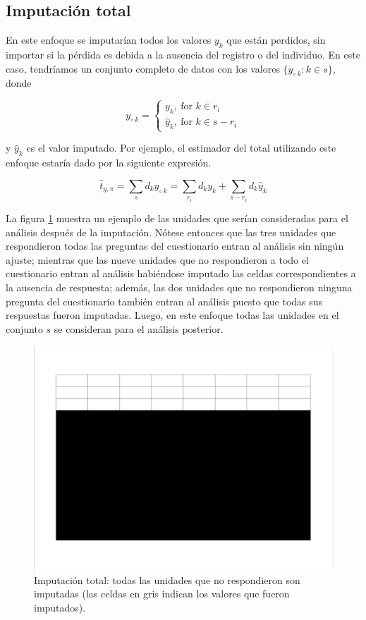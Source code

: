\documentclass[
  12pt,
  spanish,
]{book}
\begin{document}
\hypertarget{imputaciuxf3n-total}{%
\subsection{Imputación total}\label{imputaciuxf3n-total}}

En este enfoque se imputarían todos los valores \(y_k\) que están perdidos, sin importar si la pérdida es debida a la ausencia del registro o del individuo. En este caso, tendríamos un conjunto completo de datos con los valores \(\{y_{\circ \  k}: k\in s\}\), donde

\[
y_{\circ \  k} = 
\begin{cases}
y_k, \ \text{for $k \in r_i$} \\
\hat{y}_k, \ \text{for $k \in s - r_i$}
\end{cases}
\]

y \(\hat{y}_k\) es el valor imputado. Por ejemplo, el estimador del total utilizando este enfoque estaría dado por la siguiente expresión.

\[
\hat{t}_{y,\pi} = \sum_s d_{k}y_{\circ \  k}
= \sum_{r_i}d_{k}y_k + \sum_{s - r_i}d_{k}\hat{y}_k
\]

La figura \ref{fig:figimptotal} muestra un ejemplo de las unidades que serían consideradas para el análisis después de la imputación. Nótese entonces que las tres unidades que respondieron todas las preguntas del cuestionario entran al análisis sin ningún ajuste; mientras que las nueve unidades que no respondieron a todo el cuestionario entran al análisis habiéndose imputado las celdas correspondientes a la ausencia de respuesta; además, las dos unidades que no respondieron ninguna pregunta del cuestionario también entran al análisis puesto que todas sus respuestas fueron imputadas. Luego, en este enfoque todas las unidades en el conjunto \(s\) se consideran para el análisis posterior.

\begin{figure}
\includegraphics[width=0.5\linewidth]{Pics/j2} \caption{Imputación total: todas las unidades que no respondieron son imputadas (las celdas en gris indican los valores que fueron imputados).}\label{fig:figimptotal}
\end{figure}
\end{document}
